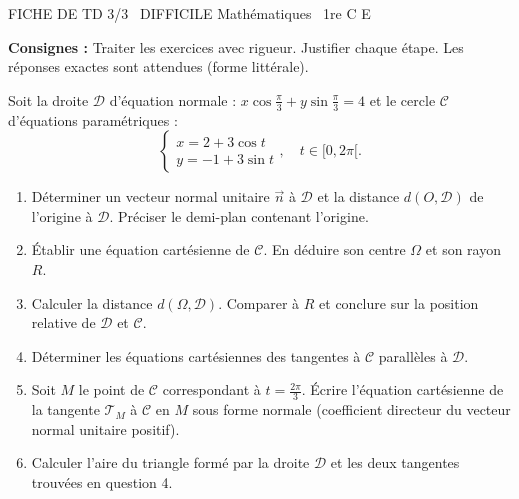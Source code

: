 \documentclass[11pt]{article}
\begin{document}
\begin{tcolorbox}[enhanced,colback=popink,colframe=popink,arc=10pt,boxrule=0pt,left=12pt,right=12pt,top=9pt,bottom=9pt]
{\color{white}\popxbold\small FICHE DE TD 3/3 \textbullet\ DIFFICILE \hfill Mathématiques \textbullet\ 1re C E\par}
\end{tcolorbox}
\vspace{4pt}
\noindent\textbf{Consignes :} Traiter les exercices avec rigueur. Justifier chaque étape. Les réponses exactes sont attendues (forme littérale).\\

\begin{exercice}
Soit la droite $\mathcal{D}$ d'équation normale : $x\cos\frac{\pi}{3} + y\sin\frac{\pi}{3} = 4$ et le cercle $\mathcal{C}$ d'équations paramétriques :
\[
\begin{cases}
x = 2 + 3\cos t \\
y = -1 + 3\sin t
\end{cases},\quad t\in[0, 2\pi[.
\]
\begin{enumerate}
    \item Déterminer un vecteur normal unitaire $\vec{n}$ à $\mathcal{D}$ et la distance $d(O, \mathcal{D})$ de l'origine à $\mathcal{D}$. Préciser le demi-plan contenant l'origine.
    \item Établir une équation cartésienne de $\mathcal{C}$. En déduire son centre $\Omega$ et son rayon $R$.
    \item Calculer la distance $d(\Omega, \mathcal{D})$. Comparer à $R$ et conclure sur la position relative de $\mathcal{D}$ et $\mathcal{C}$.
    \item Déterminer les équations cartésiennes des tangentes à $\mathcal{C}$ parallèles à $\mathcal{D}$.
    \item Soit $M$ le point de $\mathcal{C}$ correspondant à $t = \frac{2\pi}{3}$. Écrire l'équation cartésienne de la tangente $\mathcal{T}_M$ à $\mathcal{C}$ en $M$ sous forme normale (coefficient directeur du vecteur normal unitaire positif).
    \item Calculer l'aire du triangle formé par la droite $\mathcal{D}$ et les deux tangentes trouvées en question 4.
\end{enumerate}
\end{exercice}
\end{document}
